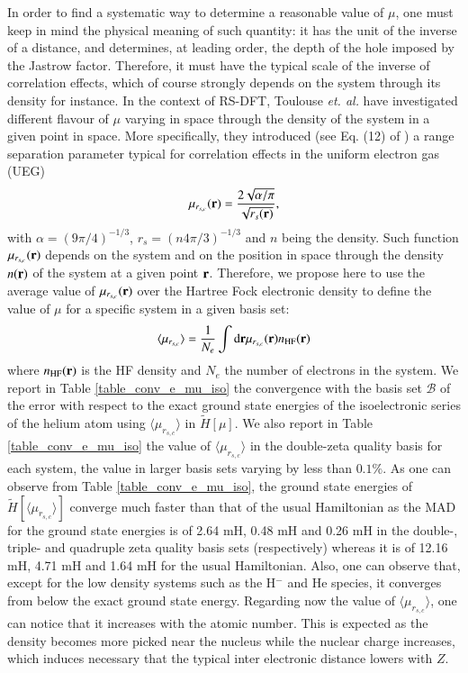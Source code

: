 \documentclass[aip,jcp,reprint,noshowkeys,superscriptaddress,twocolumn]{revtex4-1}
\newcommand{\basis}[0]{\mathcal{B}}
\newcommand{\mursc}{ \mu_{r_{s,c}}}
\newcommand{\murscav}{\langle \mu_{r_{s,c}}\rangle}
\begin{document}
In order to find a systematic way to determine a reasonable value of $\mu$, one must keep in mind the physical meaning of such quantity: it has the unit of the inverse of a distance, and determines, at leading order, the depth of the hole imposed by the Jastrow factor. 
Therefore, it must have the typical scale of the inverse of correlation effects, which of course strongly depends on the system through its density for instance. In the context of RS-DFT, Toulouse \textit{et. al.}\cite{TouColSav-JCP-05} have investigated different flavour of $\mu$ varying in space through the density of the system in a given point in space. 
More specifically, they introduced (see Eq. (12) of ) a range separation parameter typical for correlation effects in the uniform electron gas (UEG) 
\begin{equation}
 \mursc({\bf r}) =  \frac{2\sqrt{\alpha / \pi}}{\sqrt{r_s({\bf r})}},
\end{equation}
with $\alpha = (9 \pi/4)^{-1/3}$, $r_s = (n 4 \pi /3)^{-1/3}$ and $n$ being the density. 
Such function $\mursc({\bf r})$ depends on the system and on the position in space through the density $n({\bf r})$ of the system at a given point ${\bf r}$. 
Therefore, we propose here to use the average value of $\mursc({\bf r})$ over the Hartree Fock electronic density to define the value of $\mu$ for a specific system in a given basis set:
\begin{equation}
 \label{eq:mu_av_rsc}
 \murscav = \frac{1}{N_e}\int \text{d}{\bf r} \mursc({\bf r}) n_{\text{HF}}({\bf r}) 
\end{equation}
where $n_{\text{HF}}({\bf r})$ is the HF density and $N_e$ the number of electrons in the system. 
We report in Table \ref{table_conv_e_mu_iso} the convergence with the basis set $\basis$ of the error with respect to the exact ground state energies of the isoelectronic series of the helium atom using $\murscav$ in $\tilde{H}[\mu]$. 
We also report in Table \ref{table_conv_e_mu_iso} the value of $\murscav$ in the double-zeta quality basis for each system, the value in larger basis sets varying by less than $0.1\%$. 
As one can observe from  Table \ref{table_conv_e_mu_iso}, the ground state energies of $\tilde{H}[\murscav]$ converge much faster than that of the usual Hamiltonian as the MAD for the ground state energies is of 2.64 mH, 0.48 mH and 0.26 mH in the double-, triple- and quadruple zeta quality basis sets (respectively) whereas it is of 12.16 mH, 4.71 mH and 1.64 mH for the usual Hamiltonian. Also, one can observe that, except for the low density systems such as the H${^-}$ and He species, it converges from below the exact ground state energy. Regarding now the value of $\murscav $, one can notice that it increases with the atomic number. This is expected as the density becomes more picked near the nucleus while the nuclear charge increases, which induces necessary that the typical inter electronic distance lowers with $Z$. 
\end{document}
